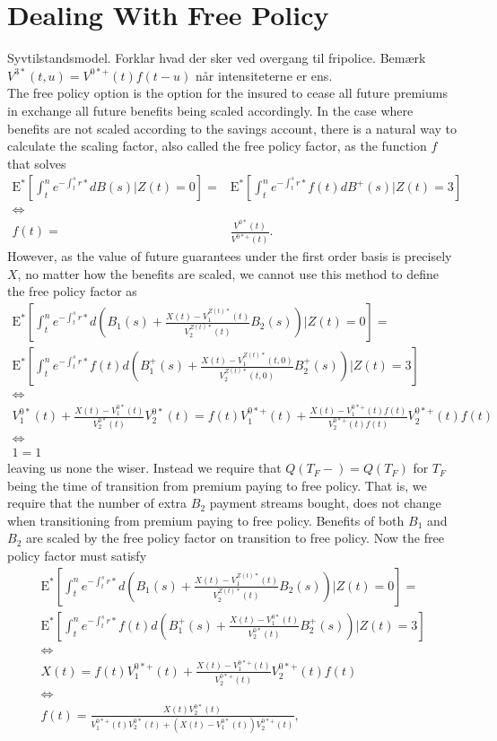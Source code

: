 \documentclass[12pt]{article}
\newcommand{\E}{\text{E}}
\theoremstyle{my_thm}
\begin{document}
\section{Dealing With Free Policy}
Syvtilstandsmodel. Forklar hvad der sker ved overgang til fripolice. Bemærk $V^{3*}(t,u)=V^{0*+}(t)f(t-u)$ når intensiteterne er ens.\\

The free policy option is the option for the insured to cease all future premiums in exchange all future benefits being scaled accordingly. In the case where benefits are not scaled according to the savings account, there is a natural way to calculate the scaling factor, also called the free policy factor, as the function $f$ that solves
\begin{align*}
\E^* \left[ \int_t^n e^{-\int_t^s r*} dB(s)|Z(t)=0 \right]
=&\E^* \left[ \int_t^n e^{-\int_t^s r*} f(t) dB^+(s)|Z(t)=3 \right]
\\
\Leftrightarrow&
\\
f(t)=&\frac{V^{0*}(t)}{V^{0*+}(t)}.
\end{align*}
However, as the value of future guarantees under the first order basis is precisely $X$, no matter how the benefits are scaled, we cannot use this method to define the free policy factor as
\begin{gather*}
\E^* \left[ \int_t^n e^{-\int_t^s r*} d \left( B_1(s)+\frac{X(t)-V_1^{Z(t)*}(t)}{V_2^{Z(t)*}(t)}B_2(s) \right) |Z(t)=0 \right]
=
\\
\E^* \left[ \int_t^n e^{-\int_t^s r*} f(t) d \left( B_1^+(s)+\frac{X(t)-V_1^{Z(t)*}(t,0)}{V_2^{Z(t)*}(t,0)}B_2^+(s) \right) |Z(t)=3 \right]
\\
\Leftrightarrow
\\
V_1^{0*}(t)+ \frac{X(t)-V_1^{0*}(t)}{V_2^{0*}(t)}V_2^{0*}(t)
=
f(t)V_1^{0*+}(t)+ \frac{X(t)-V_1^{0*+}(t)f(t)}{V_2^{0*+}(t)f(t)}V_2^{0*+}(t)f(t)
\\
 \Leftrightarrow
\\
1=1
\end{gather*}
leaving us none the wiser. Instead we require that $Q(T_F-)=Q(T_F)$ for $T_F$ being the time of transition from premium paying to free policy. That is, we require that the number of extra $B_2$ payment streams bought, does not change when transitioning from premium paying to free policy. Benefits of both $B_1$ and $B_2$ are scaled by the free policy factor on transition to free policy. Now the free policy factor must satisfy
\begin{gather*}
\E^* \left[ \int_t^n e^{-\int_t^s r*} d \left( B_1(s)+\frac{X(t)-V_1^{Z(t)*}(t)}{V_2^{Z(t)*}(t)}B_2(s) \right) |Z(t)=0 \right]
=
\\
\E^* \left[ \int_t^n e^{-\int_t^s r*} f(t) d \left( B_1^+(s)+\frac{X(t)-V_1^{0*}(t)}{V_2^{0*}(t)}B_2^+(s) \right) |Z(t)=3 \right]
\\
\Leftrightarrow
\\
X(t)
=
f(t)V_1^{0*+}(t)+ \frac{X(t)-V_1^{0*+}(t)}{V_2^{0*+}(t)}V_2^{0*+}(t)f(t)
\\
\Leftrightarrow
\\
f(t)=\frac{X(t)V_2^{0*}(t)}{V_1^{0*+}(t)V_2^{0*}(t)+(X(t)-V_1^{0*}(t))V_2^{0*+}(t)},
\end{gather*}
\end{document}

